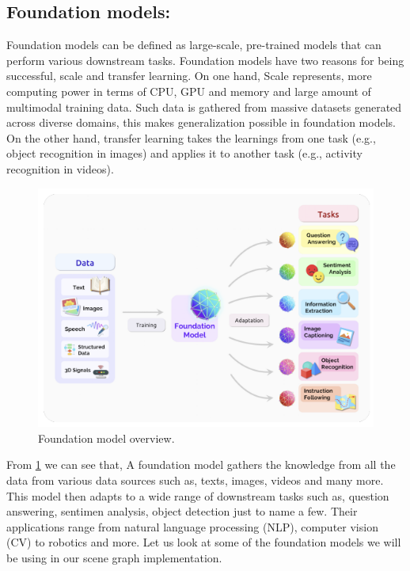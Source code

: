 \subsection{Foundation models:}
Foundation models can be defined as large-scale, pre-trained models that can perform various downstream tasks\cite{bommasani2022opportunitiesrisksfoundationmodels}. 
Foundation models have two reasons for being successful, scale and transfer learning. On one hand, Scale represents,
more computing power in terms of CPU, GPU and memory and large amount of multimodal training data. Such data is gathered from 
massive datasets generated across diverse domains, this makes generalization possible in foundation models. On the other hand, transfer
learning takes the learnings from one task (e.g., object recognition in images) and
applies it to another task (e.g., activity recognition in videos). 
\begin{figure}[h!]
    \centering
    \includegraphics[width=\textwidth]{images/FoundationModels.png}
    \caption{Foundation model overview.}
    \label{fig:foundation_model}
\end{figure}
From \cref{fig:foundation_model} we can see that, 
A foundation model gathers the knowledge from all the data from various data sources such as, texts, images, videos and many more.
This model then adapts to a wide range of downstream tasks such as, question answering, sentimen analysis, object detection just to 
name a few. Their applications range from natural language processing (NLP), computer vision (CV) to robotics and more. 
Let us look at some of the foundation models we will be using in our scene graph implementation.

